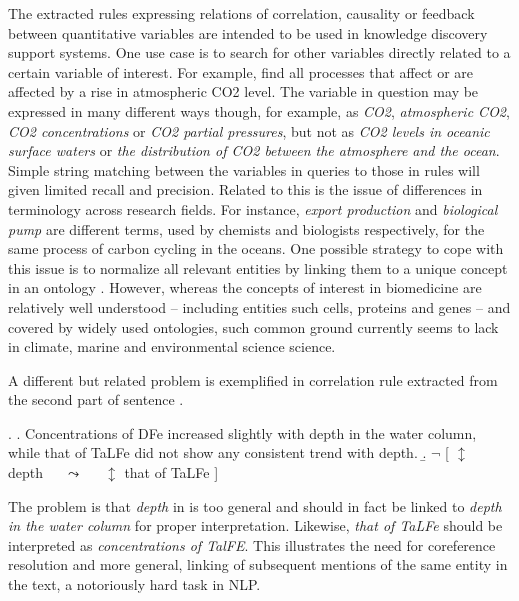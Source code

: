 \documentclass[10pt, a4paper]{article}
\begin{document}
The extracted rules expressing relations of correlation, causality or feedback between quantitative variables are intended to be used in knowledge discovery support systems.
One use case is to search for other variables directly related to a certain variable of interest.
For example, find all processes that affect or are affected by a rise in atmospheric CO2 level.
The variable in question may be expressed in many different ways though, for example, as \emph{CO2}, \emph{atmospheric CO2}, \emph{CO2 concentrations} or \emph{CO2 partial pressures}, but not as \emph{ CO2 levels in oceanic surface waters} or \emph{the distribution of CO2 between the atmosphere and the ocean}.
Simple string matching between the variables in queries to those in rules will given limited recall and precision.
Related to this is the issue of differences in terminology across research fields.
For instance, \emph{export production} and \emph{biological pump} are different terms, used by chemists and biologists respectively, for the same process of carbon cycling in the oceans. 
One possible strategy to cope with this issue is to normalize all relevant entities by linking them to a unique concept in an ontology \cite{Bada2012Concept}.
However, whereas the concepts of interest in biomedicine are relatively well understood -- including entities such cells, proteins and genes -- and covered by widely used ontologies, such common ground currently seems to lack in climate, marine and environmental science science.

A different but related problem is exemplified in correlation rule \Next[b] extracted from the second part of sentence \Next[a].

\exi. 
  \a. Concentrations of DFe increased slightly with depth in the water column, while that of TaLFe did not show any consistent trend with depth.
  \b. $\neg$ [ $\updownarrow$ depth~~~$\leadsto$~~~$\updownarrow$ that of TaLFe ]

The problem is that \emph{depth} in \Last[b] is too general and should in fact be linked to \emph{depth in the water column} for proper interpretation. 
Likewise, \emph{that of TaLFe} should be interpreted as \emph{concentrations of TalFE}.
This illustrates the need for coreference resolution and more general, linking of subsequent mentions of the same entity in the text, a notoriously hard task in NLP. 
\end{document}
